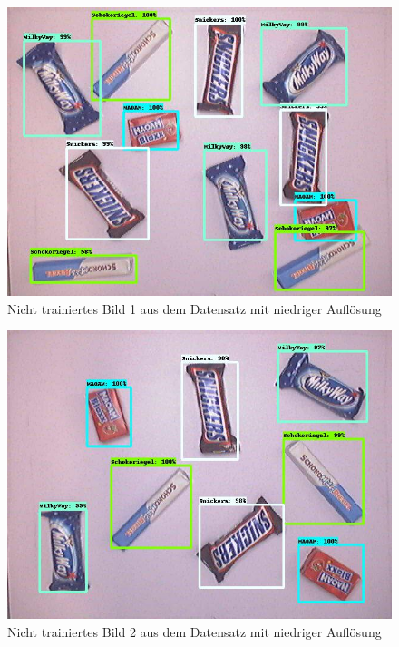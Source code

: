     \begin{figure}[H]
        \centering
        \includegraphics[angle = 90, width = \textwidth]{Bilder/models/model_comparison/efficientdet_d1_coco17_tpu-32/non_trained_1.jpg}
        \caption{Nicht trainiertes Bild 1 aus dem Datensatz mit niedriger Auflösung}
    \end{figure}
    
    \begin{figure}[H]
        \centering
        \includegraphics[angle = 90, width = \textwidth]{Bilder/models/model_comparison/efficientdet_d1_coco17_tpu-32/non_trained_2.jpg}
        \caption{Nicht trainiertes Bild 2 aus dem Datensatz mit niedriger Auflösung}
    \end{figure}
    
